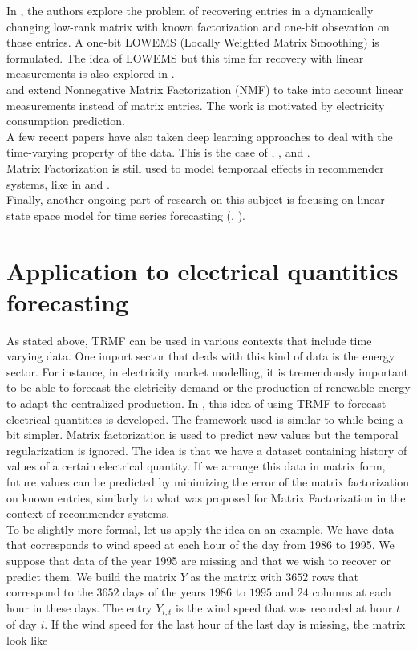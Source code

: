 \documentclass{article}
\begin{document}
In \cite{1bit}, the authors explore the problem of recovering entries in a dynamically changing low-rank matrix with known factorization and one-bit obsevation on those entries. A one-bit LOWEMS (Locally Weighted Matrix Smoothing) is formulated. The idea of LOWEMS but this time for recovery with linear measurements is also explored in \cite{LOWEMS}.\\
\cite{linear1} and \cite{linear2} extend Nonnegative Matrix Factorization (NMF) to take into account linear measurements instead of matrix entries. The work is motivated by electricity consumption prediction. \\
A few recent papers have also taken deep learning approaches to deal with the time-varying property of the data. This is the case of \cite{ChungGCB14}, \cite{Yoon2017MultidirectionalRN}, \cite{deep1} and \cite{deep2}. \\
Matrix Factorization is still used to model temporaal effects in recommender systems, like in \cite{rs1} and \cite{rs2}. \\
Finally, another ongoing part of research on this subject is focusing on linear state space model for time series forecasting (\cite{ss1}, \cite{ss2}). \\

\section{Application to electrical quantities forecasting}
\label{app}
As stated above, TRMF can be used in various contexts that include time varying data. One import sector that deals with this kind of data is the energy sector.
For instance, in electricity market modelling, it is tremendously important to be able to forecast the elctricity demand or the production of renewable energy to adapt the centralized production.
In \cite{Elec}, this idea of using TRMF to forecast electrical quantities is developed.
The framework used is similar to \cite{TRMF} while being a bit simpler. Matrix factorization is used to predict new values but the temporal regularization is ignored. The idea is that we have a dataset containing history of values of a certain electrical quantity. If we arrange this data in matrix form, future values can be predicted by minimizing the error of the matrix factorization on known entries, similarly to what was proposed for Matrix Factorization in the context of recommender systems. \\
To be slightly more formal, let us apply the idea on an example. We have data that corresponds to wind speed at each hour of the day from 1986 to 1995. We suppose that data of the year 1995 are missing and that we wish to recover or predict them. We build the matrix $Y$ as the matrix with $3652$ rows that correspond to the $3652$ days of the years $1986$ to $1995$ and $24$ columns at each hour in these days. The entry $Y_{i,t}$ is the wind speed that was recorded at hour $t$ of day $i$. If the wind speed for the last hour of the last day is missing, the matrix look like
\end{document}
